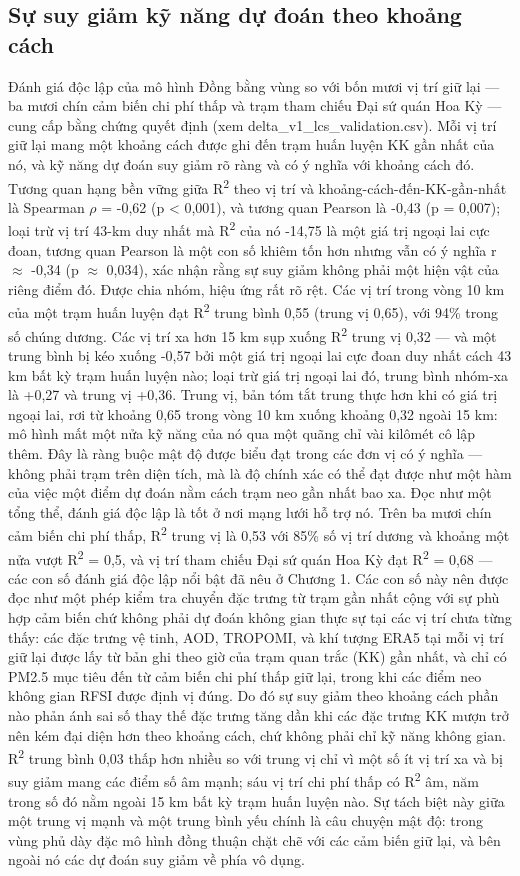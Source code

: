 \subsection{Sự suy giảm kỹ năng dự đoán theo khoảng cách}
Đánh giá độc lập của mô hình Đồng bằng vùng so với bốn mươi vị trí giữ lại --- ba mươi chín cảm biến chi phí thấp và trạm tham chiếu Đại sứ quán Hoa Kỳ --- cung cấp bằng chứng quyết định (xem delta\_v1\_lcs\_validation.csv). Mỗi vị trí giữ lại mang một khoảng cách được ghi đến trạm huấn luyện KK gần nhất của nó, và kỹ năng dự đoán suy giảm rõ ràng và có ý nghĩa với khoảng cách đó. Tương quan hạng bền vững giữa R\textsuperscript{2} theo vị trí và khoảng-cách-đến-KK-gần-nhất là Spearman $\rho$ = -0,62 (p < 0,001), và tương quan Pearson là -0,43 (p = 0,007); loại trừ vị trí 43-km duy nhất mà R\textsuperscript{2} của nó -14,75 là một giá trị ngoại lai cực đoan, tương quan Pearson là một con số khiêm tốn hơn nhưng vẫn có ý nghĩa r $\approx$ -0,34 (p $\approx$ 0,034), xác nhận rằng sự suy giảm không phải một hiện vật của riêng điểm đó. Được chia nhóm, hiệu ứng rất rõ rệt. Các vị trí trong vòng 10 km của một trạm huấn luyện đạt R\textsuperscript{2} trung bình 0,55 (trung vị 0,65), với 94\% trong số chúng dương. Các vị trí xa hơn 15 km sụp xuống R\textsuperscript{2} trung vị 0,32 --- và một trung bình bị kéo xuống -0,57 bởi một giá trị ngoại lai cực đoan duy nhất cách 43 km bất kỳ trạm huấn luyện nào; loại trừ giá trị ngoại lai đó, trung bình nhóm-xa là +0,27 và trung vị +0,36. Trung vị, bản tóm tắt trung thực hơn khi có giá trị ngoại lai, rơi từ khoảng 0,65 trong vòng 10 km xuống khoảng 0,32 ngoài 15 km: mô hình mất một nửa kỹ năng của nó qua một quãng chỉ vài kilômét cô lập thêm. Đây là ràng buộc mật độ được biểu đạt trong các đơn vị có ý nghĩa --- không phải trạm trên diện tích, mà là độ chính xác có thể đạt được như một hàm của việc một điểm dự đoán nằm cách trạm neo gần nhất bao xa.
Đọc như một tổng thể, đánh giá độc lập là tốt ở nơi mạng lưới hỗ trợ nó. Trên ba mươi chín cảm biến chi phí thấp, R\textsuperscript{2} trung vị là 0,53 với 85\% số vị trí dương và khoảng một nửa vượt R\textsuperscript{2} = 0,5, và vị trí tham chiếu Đại sứ quán Hoa Kỳ đạt R\textsuperscript{2} = 0,68 --- các con số đánh giá độc lập nổi bật đã nêu ở Chương 1. Các con số này nên được đọc như một phép kiểm tra chuyển đặc trưng từ trạm gần nhất cộng với sự phù hợp cảm biến chứ không phải dự đoán không gian thực sự tại các vị trí chưa từng thấy: các đặc trưng vệ tinh, AOD, TROPOMI, và khí tượng ERA5 tại mỗi vị trí giữ lại được lấy từ bản ghi theo giờ của trạm quan trắc (KK) gần nhất, và chỉ có PM2.5 mục tiêu đến từ cảm biến chi phí thấp giữ lại, trong khi các điểm neo không gian RFSI được định vị đúng. Do đó sự suy giảm theo khoảng cách phần nào phản ánh sai số thay thế đặc trưng tăng dần khi các đặc trưng KK mượn trở nên kém đại diện hơn theo khoảng cách, chứ không phải chỉ kỹ năng không gian. R\textsuperscript{2} trung bình 0,03 thấp hơn nhiều so với trung vị chỉ vì một số ít vị trí xa và bị suy giảm mang các điểm số âm mạnh; sáu vị trí chi phí thấp có R\textsuperscript{2} âm, năm trong số đó nằm ngoài 15 km bất kỳ trạm huấn luyện nào. Sự tách biệt này giữa một trung vị mạnh và một trung bình yếu chính là câu chuyện mật độ: trong vùng phủ dày đặc mô hình đồng thuận chặt chẽ với các cảm biến giữ lại, và bên ngoài nó các dự đoán suy giảm về phía vô dụng.
